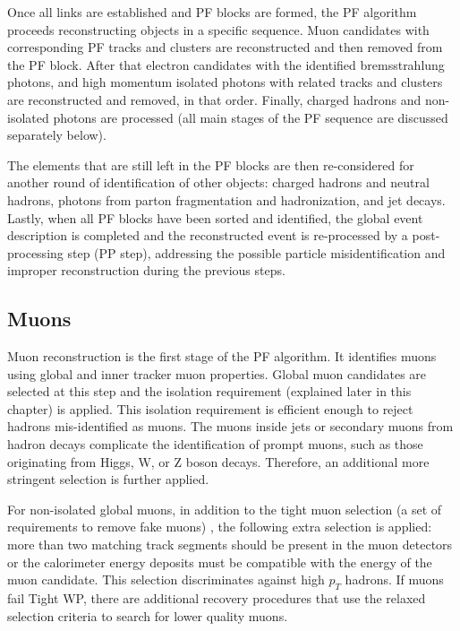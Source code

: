 Once all links are established and PF blocks are formed, the PF algorithm proceeds reconstructing objects in a specific sequence. Muon candidates with corresponding PF tracks and clusters are reconstructed and then removed from the PF block. After that electron candidates with the identified bremsstrahlung photons, and high momentum isolated photons with related tracks and clusters are reconstructed and removed, in that order. Finally, charged hadrons and non-isolated photons are processed (all main stages of the PF sequence are discussed separately below).

The elements that are still left in the PF blocks are then re-considered for another round of identification of other objects: charged hadrons and neutral hadrons, photons from parton fragmentation and hadronization, and jet decays. Lastly, when all PF blocks have been sorted and identified, the global event description is completed and the reconstructed event is re-processed by a post-processing step (PP step), addressing the possible particle misidentification and improper reconstruction during the previous steps. 

\subsection{Muons}\label{sec:muons}

Muon reconstruction is the first stage of the PF algorithm. It identifies muons using global and inner tracker muon properties. Global muon candidates are selected at this step and the isolation requirement (explained later in this chapter) is applied. This isolation requirement is efficient enough to reject hadrons mis-identified as muons. The muons inside jets or secondary muons from hadron decays complicate the identification of prompt muons, such as those originating from Higgs, W, or Z boson decays. Therefore, an additional more stringent selection is further applied. 

For non-isolated global muons, in addition to the tight muon selection (a set of requirements to remove fake muons) \cite{tight_muon_selection_PF}, the following extra selection is applied: more than two matching track segments should be present in the muon detectors or the calorimeter energy deposits must be compatible with the energy of the muon candidate. This selection discriminates against high $p_T$ hadrons. If muons fail Tight WP, there are additional recovery procedures that use the relaxed selection criteria to search for lower quality muons.

